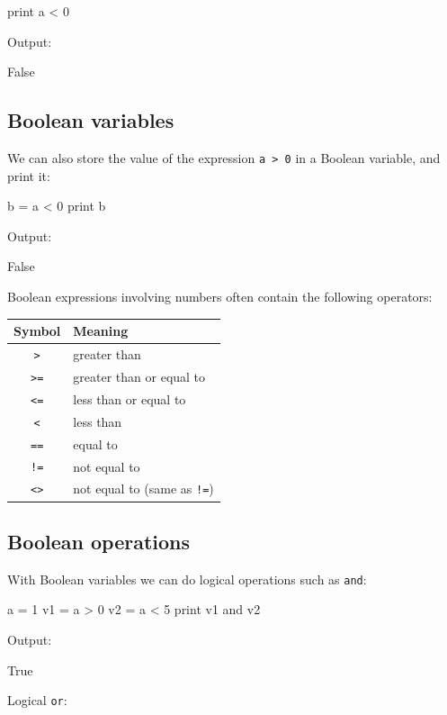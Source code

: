 \begin{bluecode}
print a < 0
\end{bluecode}
Output:

\begin{bluecode}
False
\end{bluecode}

\subsection{Boolean variables}

We can also store the value of the expression {\tt a > 0} in a Boolean variable,
and print it:
\begin{bluecode}
b = a < 0
print b
\end{bluecode}
Output:

\begin{bluecode}
False
\end{bluecode}
Boolean expressions involving numbers often contain the following operators:

\begin{center}
\begin{tabular}{|c|l|}
\hline
Symbol & Meaning \\
\hline
{\tt >} & greater than\\
{\tt >=} & greater than or equal to\\
{\tt <=} & less than or equal to\\
{\tt <} & less than\\
{\tt ==} & equal to\\
{\tt !=} & not equal to\\
{\tt <>} & not equal to (same as {\tt !=})\\
\hline
\end{tabular}
\end{center}

\subsection{Boolean operations}

With Boolean variables we can do logical operations such as {\tt and}:

\begin{bluecode}
a = 1
v1 = a > 0
v2 = a < 5
print v1 and v2
\end{bluecode}
Output:

\begin{bluecode}
True
\end{bluecode}
Logical {\tt or}:

